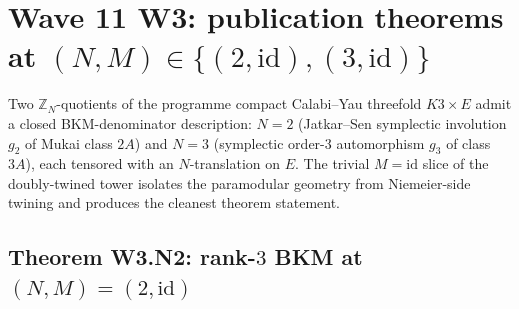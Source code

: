 %
%
%
\providecommand{\ClaimStatusTheorem}{\textbf{[Theorem]}}
\providecommand{\ClaimStatusConjectured}{\textbf{[Conjecture]}}
\providecommand{\kappaBKM}{\kappa_{\mathrm{BKM}}}
\providecommand{\kappach}{\kappa_{\mathrm{ch}}}
\providecommand{\kappacat}{\kappa_{\mathrm{cat}}}
\providecommand{\kappafib}{\kappa_{\mathrm{fiber}}}
\providecommand{\Fgc}{F^{\mathrm{GC}}}
\providecommand{\ZredDT}{Z^{\mathrm{red}}_{\mathrm{DT}}}
\providecommand{\gBKM}{\mathfrak{g}}
\providecommand{\Lambdhyp}{\Lambda^{2,1}_{II}}

\section*{Wave 11 W3: publication theorems at $(N, M) \in \{(2, \mathrm{id}), (3, \mathrm{id})\}$}
\label{sec:wave11-w3-N-2-3-theorems}

Two $\mathbb{Z}_N$-quotients of the programme compact Calabi--Yau threefold
$K3 \times E$ admit a closed BKM-denominator description: $N = 2$
(Jatkar--Sen symplectic involution $g_2$ of Mukai class $2A$) and $N = 3$
(symplectic order-$3$ automorphism $g_3$ of class $3A$), each tensored with
an $N$-translation on $E$. The trivial $M = \mathrm{id}$ slice of the
doubly-twined tower isolates the paramodular geometry from Niemeier-side
twining and produces the cleanest theorem statement.

\subsection*{Theorem W3.N2: rank-$3$ BKM at $(N, M) = (2, \mathrm{id})$}
\label{thm:wave11-w3-rank3-BKM-N2-id}

